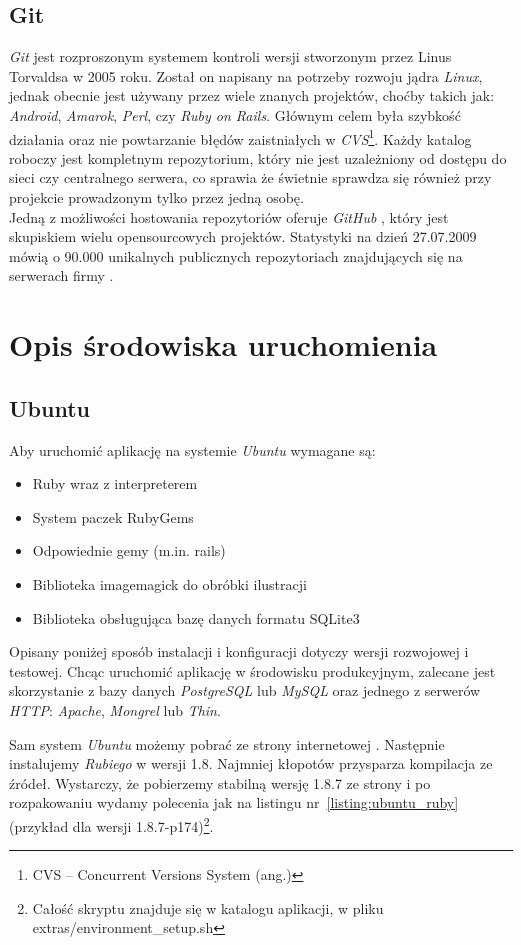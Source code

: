\documentclass[a4paper,12pt]{article}
\begin{document}
\subsection{Git}
\emph{Git} jest rozproszonym systemem kontroli wersji stworzonym przez Linus Torvaldsa w 2005 roku.
Został on napisany na potrzeby rozwoju jądra \emph{Linux}, jednak obecnie jest używany
przez wiele znanych projektów, choćby takich jak: \emph{Android}, \emph{Amarok}, \emph{Perl},
czy \emph{Ruby on Rails}. Głównym celem była szybkość działania oraz nie powtarzanie błędów
zaistniałych w \emph{CVS}\footnote{CVS -- Concurrent Versions System (ang.)}.
Każdy katalog roboczy jest kompletnym repozytorium, który nie jest uzależniony od dostępu
do sieci czy centralnego serwera, co sprawia że świetnie sprawdza się również przy projekcie
prowadzonym tylko przez jedną osobę.\\
Jedną z możliwości hostowania repozytoriów oferuje \emph{GitHub} \cite{github}, który jest
skupiskiem wielu opensourcowych projektów. Statystyki na dzień 27.07.2009 mówią o 90.000
unikalnych publicznych repozytoriach znajdujących się na serwerach firmy \cite{github-statistics}.


\clearpage
\section{Opis środowiska uruchomienia}
\subsection{Ubuntu}
Aby uruchomić aplikację na systemie \emph{Ubuntu} wymagane są:
\begin{itemize}
  \item{Ruby wraz z interpreterem}
  \item{System paczek RubyGems}
  \item{Odpowiednie gemy (m.in. rails)}
  \item{Biblioteka imagemagick do obróbki ilustracji}
  \item{Biblioteka obsługująca bazę danych formatu SQLite3}
\end{itemize}


Opisany poniżej sposób instalacji i konfiguracji dotyczy wersji rozwojowej i testowej.
Chcąc uruchomić aplikację w środowisku produkcyjnym, zalecane jest skorzystanie z bazy
danych \emph{PostgreSQL} lub \emph{MySQL} oraz jednego z serwerów \emph{HTTP}:
\emph{Apache}, \emph{Mongrel} lub \emph{Thin}.


Sam system \emph{Ubuntu} możemy pobrać ze strony internetowej \cite{ubuntu}.
Następnie instalujemy \emph{Rubiego} w wersji 1.8. Najmniej kłopotów przysparza kompilacja ze
źródeł. Wystarczy, że pobierzemy stabilną wersję 1.8.7 ze strony \cite{ruby-package} i po
rozpakowaniu wydamy polecenia jak na listingu nr~\ref{listing:ubuntu_ruby} (przykład dla
wersji 1.8.7-p174)\footnote{Całość skryptu znajduje się w katalogu aplikacji, w pliku
extras/environment\_setup.sh}.
\end{document}
